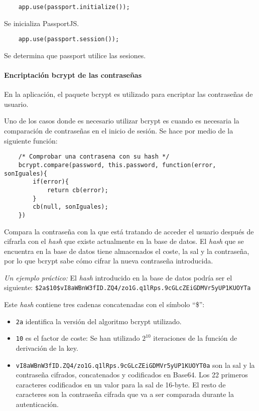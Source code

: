 \medskip
\begin{lstlisting}
	app.use(passport.initialize());
\end{lstlisting}


Se inicializa PassportJS.


\medskip
\begin{lstlisting}
	app.use(passport.session());
\end{lstlisting}


Se determina que passport utilice las sesiones.


\paragraph*{Encriptación bcrypt de las contraseñas}
En la aplicación, el paquete bcrypt es utilizado para encriptar las contraseñas de usuario.


Uno de los casos donde es necesario utilizar bcrypt es cuando es necesaria la comparación de contraseñas en el inicio de sesión. Se hace por medio de la siguiente función:


\medskip
\begin{lstlisting}
	/* Comprobar una contrasena con su hash */ 
	bcrypt.compare(password, this.password, function(error, sonIguales){ 
		if(error){ 
			return cb(error); 
		} 
		cb(null, sonIguales); 
	}) 
\end{lstlisting}

Compara la contraseña con la que está tratando de acceder el usuario después de cifrarla con el \textit{hash} que existe actualmente en la base de datos. El \textit{hash} que se encuentra en la base de datos tiene almacenados el coste, la sal y la contraseña, por lo que bcrypt sabe cómo cifrar la nueva contraseña introducida.


\textit{Un ejemplo práctico:}
El \textit{hash} introducido en la base de datos podría ser el siguiente:
\texttt{\$2a\$10\$vI8aWBnW3fID.ZQ4/zo1G.q1lRps.9cGLcZEiGDMVr5yUP1KUOYTa}


Este \textit{hash} contiene tres cadenas concatenadas con el símbolo ``\$'':
\begin{itemize}
\item \texttt{2a} identifica la versión del algoritmo bcrypt utilizado.
\item \texttt{10} es el factor de coste: Se han utilizado $2^{10}$ iteraciones de la función de derivación de la key.
\item \texttt{vI8aWBnW3fID.ZQ4/zo1G.q1lRps.9cGLcZEiGDMVr5yUP1KUOYT0a} son la sal y la contraseña cifrados, concatenados y codificados en Base64. Los 22 primeros caracteres codificados en un valor para la sal de 16-byte. El resto de caracteres son la contraseña cifrada que va a ser comparada durante la autenticación.
\end{itemize}


